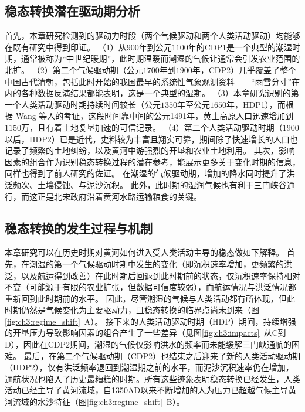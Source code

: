 \subsection{稳态转换潜在驱动期分析}

首先，本章研究检测到的驱动力时段（两个气候驱动和两个人类活动驱动）均能够在既有研究中得到印证。
（1）从900年到公元$1100$年的CDP1是一个典型的潮湿时期，通常被称为“中世纪暖期”\cite{zhang1993, zhang1994, man2014}，此时期温暖而潮湿的气候让通常会引发农业范围的北扩\cite{TanQiXiang1996,GeQuanSheng2011}。
（2）第二个气候驱动期（公元$1700$年到$1900$年，CDP2）几乎覆盖了整个中国古代清朝，包括此时开始的我国最早的系统性气象观测资料——“雨雪分寸”在内的各种数据反演结果都能表明，这是一个典型的湿期\cite{hao2021, ge2008}。
（3）本章研究识别的第一个人类活动驱动时期持续时间较长（公元$1350$年至公元$1650$年，HDP1），而根据 Wang 等人的考证，这段时间靠中间的公元1491年，黄土高原人口迅速增加到$1150$万，且有着土地复垦加速的可信记录\cite{wang2006a}。
（4）第二个人类活动驱动时期（1900以后，HDP2）已是近代，史料较为丰富且翔实可靠，期间除了快速增长的人口也记录了频繁的土地纠纷，以及黄河中游强烈的开垦和农业土地利用\cite{GeJianXiong2005}。
其次，影响因素的组合作为识别稳态转换过程的潜在参考，能展示更多关于变化时期的信息，同样也得到了前人研究的佐证。
在潮湿的气候驱动期，增加的降水同时提升了洪泛频次、土壤侵蚀、与泥沙沉积\cite{chen2012}。
此外，此时期的湿润气候也有利于三门峡谷通行，而这正是北宋政府沿着黄河水路运输粮食的关键\cite{wang1993}。

\subsection{稳态转换的发生过程与机制}

本章研究可以在历史时期对黄河如何进入受人类活动主导的稳态做如下解释。
首先，在潮湿的第一个气候驱动时期中发生的变化（即沉积速率增加，更频繁的洪泛，以及航运得到改善）在此时期后回退到此时期前的状态，仅沉积速率保持相对不变（可能源于有限的农业扩张，但数据可信度较弱），而航运情况与洪泛情况都重新回到此时期前的水平。
因此，尽管潮湿的气候与人类活动都有所体现，但此时期仍然是气候变化为主要驱动力，且稳态转换的临界点尚未到来（图\ref{fig:ch3:regime_shift}~A）。
接下来的人类活动驱动时期（HDP）期间，持续增强的开垦压力导致影响因素的组合产生了一些差异（见图\ref{fig:ch3:impacts}~从C到D），因此在CDP2期间，潮湿的气候仅影响洪水的频率而未能缓解三门峡通航的困难。
最后，在第二个气候驱动期（CDP2）也结束之后迎来了新的人类活动驱动期（HDP2），仅有洪泛频率退回到潮湿期之前的水平，而泥沙沉积速率仍在增加，通航状况也陷入了历史最糟糕的时期。所有这些迹象表明稳态转换已经发生，人类活动已经主导了黄河流域，自1350AD以来不断增加的人为压力已超越气候主导黄河流域的水沙特征（图\ref{fig:ch3:regime_shift}~B）。

